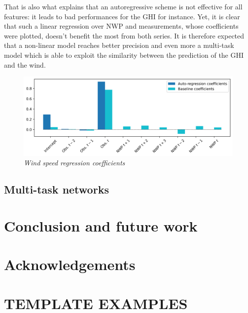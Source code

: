 \documentclass{article}
\newcommand{\saut}{\vspace{10px}}
\begin{document}
\saut

That is also what explains that an autoregressive scheme
is not effective for all features: it leads to bad performances for the GHI
for instance. Yet, it is clear that such a linear regression over NWP and measurements, whose coefficients were
plotted, doesn't benefit the most from both series. It is therefore expected that a non-linear model reaches
better precision and even more a multi-task model which is able to exploit the similarity between the prediction of
the GHI and the wind.


\begin{figure}[H]
    \centering
    \includegraphics[width=\linewidth]{img/coef.png}
    \caption{\textit{Wind speed regression coefficients}}
    \label{fig:Fig. 6}
\end{figure}

\subsection*{Multi-task networks}

\section*{Conclusion and future work}

\section*{Acknowledgements}




\newpage

\section*{TEMPLATE EXAMPLES}
\end{document}
